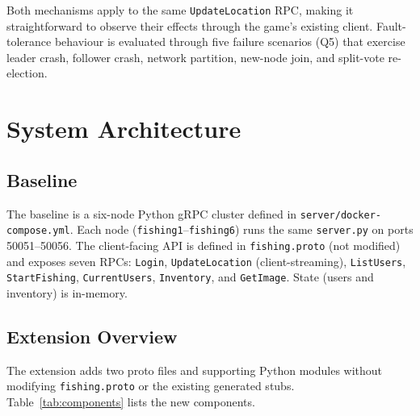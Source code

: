\documentclass[11pt]{article}
\newcommand{\rpc}[1]{\texttt{#1}}
\begin{document}
Both mechanisms apply to the same \rpc{UpdateLocation} RPC, making it straightforward to
observe their effects through the game's existing client.
Fault-tolerance behaviour is evaluated through five failure scenarios (Q5) that exercise
leader crash, follower crash, network partition, new-node join, and split-vote re-election.

\section{System Architecture}

\subsection{Baseline}

The baseline is a six-node Python gRPC cluster defined in \texttt{server/docker-compose.yml}.
Each node (\texttt{fishing1}--\texttt{fishing6}) runs the same \texttt{server.py} on ports
50051--50056.  The client-facing API is defined in \texttt{fishing.proto} (not modified) and
exposes seven RPCs: \rpc{Login}, \rpc{UpdateLocation} (client-streaming),
\rpc{ListUsers}, \rpc{StartFishing}, \rpc{CurrentUsers}, \rpc{Inventory}, and \rpc{GetImage}.
State (users and inventory) is in-memory.

\subsection{Extension Overview}

The extension adds two proto files and supporting Python modules without modifying
\texttt{fishing.proto} or the existing generated stubs.
Table~\ref{tab:components} lists the new components.
\end{document}

